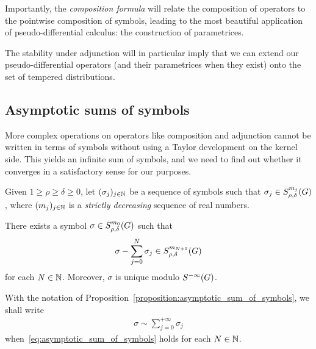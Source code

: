 Importantly,
the \emph{composition formula} will relate the composition of operators
to the pointwise composition of symbols,
leading to the most beautiful application of pseudo-differential calculus:
the construction of parametrices.

The stability under adjunction will in particular imply that we can extend our pseudo-differential operators (and their parametrices when they exist) onto the set of tempered distributions.

\subsection{Asymptotic sums of symbols}

More complex operations on operators
like composition and adjunction
cannot be written in terms of symbols without using a Taylor development on the kernel side.
This yields an infinite sum of symbols,
and we need to find out whether it converges in a satisfactory sense for our purposes.

\begin{proposition}
\label{proposition:asymptotic_sum_of_symbols}
    Given $1 \geq \rho \geq \delta \geq 0$,
    let $(\sigma_j)_{j \in \mathbb{N}}$ be a sequence of symbols such that $\sigma_j \in S^{m_j}_{\rho, \delta}(G)$,
    where $(m_j)_{j \in \mathbb{N}}$ is a \emph{strictly decreasing} sequence of real numbers.

    There exists a symbol $\sigma \in S^{m_0}_{\rho, \delta}(G)$
    such that
    \begin{align}
        \sigma - \sum_{j = 0}^N \sigma_j \in S^{m_{N + 1}}_{\rho, \delta}(G)
        \label{eq:asymptotic_sum_of_symbols}
    \end{align}
    for each $N \in \mathbb{N}$.
    Moreover, $\sigma$ is unique modulo ${S^{-\infty} (G)}$.
\end{proposition}

\begin{definition}
    With the notation of Proposition~\ref{proposition:asymptotic_sum_of_symbols},
    we shall write
    \begin{align*}
        \sigma \sim \sum_{j = 0}^{+\infty} \sigma_j
    \end{align*}
    when~\eqref{eq:asymptotic_sum_of_symbols} holds for each $N \in \mathbb{N}$.
\end{definition}

